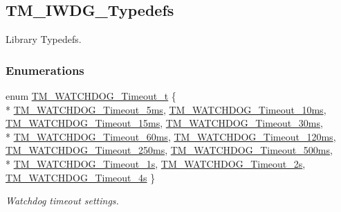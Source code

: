 \hypertarget{group___t_m___i_w_d_g___typedefs}{}\subsection{T\+M\+\_\+\+I\+W\+D\+G\+\_\+\+Typedefs}
\label{group___t_m___i_w_d_g___typedefs}


Library Typedefs.  


\subsubsection*{Enumerations}
\begin{DoxyCompactItemize}
\item 
enum \hyperlink{group___t_m___i_w_d_g___typedefs_ga3c9514e409e8cc70048b868ca9a64671}{T\+M\+\_\+\+W\+A\+T\+C\+H\+D\+O\+G\+\_\+\+Timeout\+\_\+t} \{ \\*
\hyperlink{group___t_m___i_w_d_g___typedefs_gga3c9514e409e8cc70048b868ca9a64671a764ef29a2656c829c98f2d78dc549d43}{T\+M\+\_\+\+W\+A\+T\+C\+H\+D\+O\+G\+\_\+\+Timeout\+\_\+5ms}, 
\hyperlink{group___t_m___i_w_d_g___typedefs_gga3c9514e409e8cc70048b868ca9a64671a7bbd32ffec01b6a95f4f71edb000b861}{T\+M\+\_\+\+W\+A\+T\+C\+H\+D\+O\+G\+\_\+\+Timeout\+\_\+10ms}, 
\hyperlink{group___t_m___i_w_d_g___typedefs_gga3c9514e409e8cc70048b868ca9a64671a8f990a8259213c4d2500ba221a1b73ac}{T\+M\+\_\+\+W\+A\+T\+C\+H\+D\+O\+G\+\_\+\+Timeout\+\_\+15ms}, 
\hyperlink{group___t_m___i_w_d_g___typedefs_gga3c9514e409e8cc70048b868ca9a64671a17a2e91a073e2ff292e2f4412b7fd04b}{T\+M\+\_\+\+W\+A\+T\+C\+H\+D\+O\+G\+\_\+\+Timeout\+\_\+30ms}, 
\\*
\hyperlink{group___t_m___i_w_d_g___typedefs_gga3c9514e409e8cc70048b868ca9a64671a1b82d78d2e7dcbe39b9182aa3a3860b7}{T\+M\+\_\+\+W\+A\+T\+C\+H\+D\+O\+G\+\_\+\+Timeout\+\_\+60ms}, 
\hyperlink{group___t_m___i_w_d_g___typedefs_gga3c9514e409e8cc70048b868ca9a64671a7de64610008ce6a16fdb7787a944ccbd}{T\+M\+\_\+\+W\+A\+T\+C\+H\+D\+O\+G\+\_\+\+Timeout\+\_\+120ms}, 
\hyperlink{group___t_m___i_w_d_g___typedefs_gga3c9514e409e8cc70048b868ca9a64671ab4090a7f35ab14b8f10e58a9cf287ed5}{T\+M\+\_\+\+W\+A\+T\+C\+H\+D\+O\+G\+\_\+\+Timeout\+\_\+250ms}, 
\hyperlink{group___t_m___i_w_d_g___typedefs_gga3c9514e409e8cc70048b868ca9a64671afd9f485930deba69e725472106491094}{T\+M\+\_\+\+W\+A\+T\+C\+H\+D\+O\+G\+\_\+\+Timeout\+\_\+500ms}, 
\\*
\hyperlink{group___t_m___i_w_d_g___typedefs_gga3c9514e409e8cc70048b868ca9a64671a46d9f4e33c28c9e182bbbf48019b48a2}{T\+M\+\_\+\+W\+A\+T\+C\+H\+D\+O\+G\+\_\+\+Timeout\+\_\+1s}, 
\hyperlink{group___t_m___i_w_d_g___typedefs_gga3c9514e409e8cc70048b868ca9a64671ae8bcb0df93e0eeb1ee862a7a053ada58}{T\+M\+\_\+\+W\+A\+T\+C\+H\+D\+O\+G\+\_\+\+Timeout\+\_\+2s}, 
\hyperlink{group___t_m___i_w_d_g___typedefs_gga3c9514e409e8cc70048b868ca9a64671a578a86c87af4d8dcbad89e1e10e0f1c4}{T\+M\+\_\+\+W\+A\+T\+C\+H\+D\+O\+G\+\_\+\+Timeout\+\_\+4s}
 \}
\begin{DoxyCompactList}\small\item\em Watchdog timeout settings. \end{DoxyCompactList}\end{DoxyCompactItemize}


